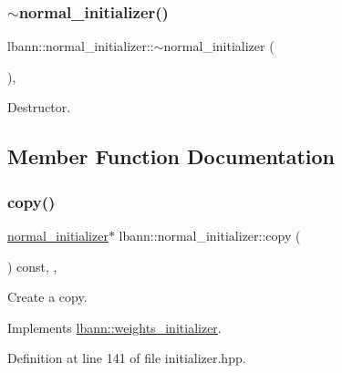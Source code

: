 \subsubsection{\texorpdfstring{$\sim$normal\+\_\+initializer()}{~normal\_initializer()}}
{\footnotesize\ttfamily lbann\+::normal\+\_\+initializer\+::$\sim$normal\+\_\+initializer (\begin{DoxyParamCaption}{ }\end{DoxyParamCaption})\hspace{0.3cm}{\ttfamily [override]}, {\ttfamily [default]}}

Destructor. 

\subsection{Member Function Documentation}
\mbox{\label{classlbann_1_1normal__initializer_a154369b8513c5cf0edf201f1e8cc0887}} 
\subsubsection{\texorpdfstring{copy()}{copy()}}
{\footnotesize\ttfamily \hyperlink{classlbann_1_1normal__initializer}{normal\+\_\+initializer}$\ast$ lbann\+::normal\+\_\+initializer\+::copy (\begin{DoxyParamCaption}{ }\end{DoxyParamCaption}) const\hspace{0.3cm}{\ttfamily [inline]}, {\ttfamily [override]}, {\ttfamily [virtual]}}

Create a copy. 

Implements \hyperlink{classlbann_1_1weights__initializer_acc84ce49188b74b23987cef3db18525a}{lbann\+::weights\+\_\+initializer}.



Definition at line 141 of file initializer.\+hpp.


